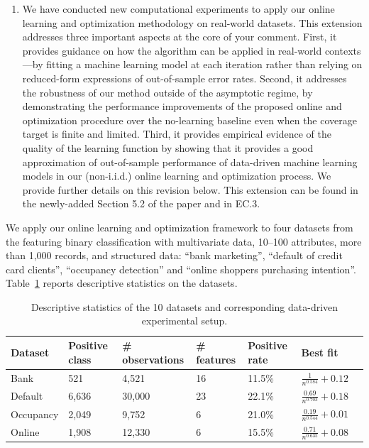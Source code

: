 \documentclass[11pt]{article}
\renewcommand{\arraystretch}{1.5}
\begin{document}
\begin{enumerate}
    \item We have conducted new computational experiments to apply our online learning and optimization methodology on real-world datasets. This extension addresses three important aspects at the core of your comment. First, it provides guidance on how the algorithm can be applied in real-world contexts---by fitting a machine learning model at each iteration rather than relying on reduced-form expressions of out-of-sample error rates. Second, it addresses the robustness of our method outside of the asymptotic regime, by demonstrating the performance improvements of the proposed online and optimization procedure over the no-learning baseline even when the coverage target is finite and limited. Third, it provides empirical evidence of the quality of the learning function by showing that it provides a good approximation of out-of-sample performance of data-driven machine learning models in our (non-i.i.d.) online learning and optimization process. We provide further details on this revision below. This extension can be found in the newly-added Section 5.2 of the paper and in EC.3.
\end{enumerate}

We apply our online learning and optimization framework to four datasets from the \cite{UCI} featuring binary classification with multivariate data, 10--100 attributes, more than 1,000 records, and structured data: ``bank marketing'', ``default of credit card clients'', ``occupancy detection'' and ``online shoppers purchasing intention''. Table~\ref{tab:dataset_R3} reports descriptive statistics on the datasets.

\begin{table}[h!]
\centering \small
\caption{Descriptive statistics of the 10 datasets and corresponding data-driven experimental setup.}
\label{tab:dataset_R3}
\renewcommand{\arraystretch}{1.3}
\begin{tabular}{lllllll}
\toprule[1pt]
Dataset & Positive class & \# observations & \# features & Positive rate & Best fit\\ \midrule[0.5pt]
Bank & 521 & 4,521 & 16 & 11.5\% & $\frac{1}{n^{0.584}}+0.12$ \\
Default & 6,636 & 30,000 & 23 & 22.1\% & $\frac{0.69}{n^{0.703}}+0.18$ \\
Occupancy & 2,049 & 9,752 & 6 & 21.0\% & $\frac{0.19}{n^{0.544}}+0.01$\\
Online & 1,908 & 12,330 & 6 & 15.5\% & $\frac{0.71}{n^{0.635}}+0.08$ \\
\bottomrule[1pt] 
\end{tabular}
\end{table}
\end{document}
